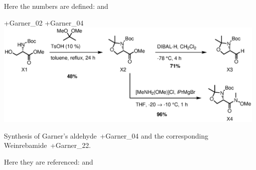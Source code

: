 \documentclass[english,
10pt,
]{scrreprt}
\begin{document}
Here the numbers are defined:  and 

\begin{scheme}[htb]
	\centering
	\replacecmpd+{Garner_02}
	\replacecmpd+{Garner_04}
	\includegraphics[scale=0.7]{garner_rxn}
	\caption{Synthesis of Garner's aldehyde~\cmpd+{Garner_04} and the corresponding Weinrebamide~\cmpd+{Garner_22}.}
\end{scheme}

Here they are referenced:  and 
\end{document}

